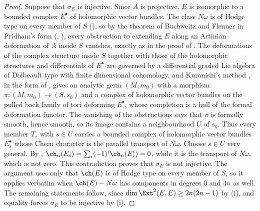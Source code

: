 \begin{proof}
Suppose that $\sigma_{E}$ is injective. Since $A$ is projective, $E$ is isomorphic to
a bounded complex $E^{\bullet}$ of holomorphic vector bundles. The class
$N\omega$ is of Hodge type on every member of $S$ (), so
by the theorem of Buchweitz and Flenner in Pridham's form (,
\cite{BF03,Pri24}), every obstruction to extending $E$ along an
Artinian deformation of $A$ inside $S$ vanishes, exactly as in the proof of
. The deformations of the complex structure inside
$S$ together with those of the holomorphic structures and differentials of
$E^{\bullet}$ are governed by a differential graded Lie algebra of Dolbeault
type with finite dimensional cohomology, and Kuranishi's method
\cite{Kur65}, in the form of \cite[Sections~2--3]{GM88}, gives an analytic
germ $(M,m_{0})$ with a morphism $\pi\colon(M,m_{0})\to(S,s_{0})$ and a
complex of holomorphic vector bundles on the pulled back family of tori
deforming $E^{\bullet}$, whose completion is a hull of the formal deformation
functor. The vanishing of the obstructions says that $\pi$ is formally
smooth, hence smooth, so its image contains a neighbourhood $U$ of $s_{0}$.
Thus every member $T_{s}$ with $s\in U$ carries a bounded complex of
holomorphic vector bundles $E_{s}^{\bullet}$ whose Chern character is the
parallel transport of $N\omega$. Choose $s\in U$ very general. By
,
$\ch_{n}(E_{s})=\sum_{i}(-1)^{i}\ch_{n}(E_{s}^{i})=0$, while it is the
transport of $N\omega$, which is not zero. This contradiction proves that
$\sigma_{E}$ is not injective. The argument uses only that $\ch(E)$ is of
Hodge type on every member of $S$, so it applies verbatim when $\ch(E)-N\omega$
has components in degrees $0$ and $4n$ as well. The remaining statements
follow, since $\dim\Ext^{2}(E,E)\ge2n(2n-1)$ by (i),
and equality forces $\sigma_{E}$ to be injective by
(i).
\end{proof}

